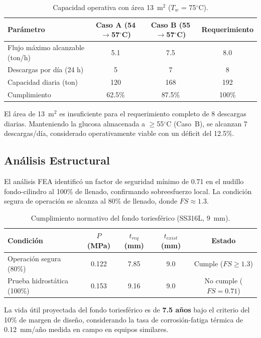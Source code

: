 \documentclass[11pt,a4paper]{article}
\begin{document}
\begin{table}[H]
\centering
\footnotesize
\caption{Capacidad operativa con área 13~m$^2$ ($T_w$ = 75$^\circ$C).}
\label{tab:capacidad}
\begin{tabular}{@{}lccc@{}}
\toprule
\textbf{Parámetro} & \textbf{Caso A (54$\rightarrow$57$^\circ$C)} & \textbf{Caso B (55$\rightarrow$57$^\circ$C)} & \textbf{Requerimiento} \\
\midrule
Flujo máximo alcanzable (ton/h) & 5.1 & 7.5 & 8.0 \\
Descargas por día (24 h) & 5 & 7 & 8 \\
Capacidad diaria (ton) & 120 & 168 & 192 \\
Cumplimiento & 62.5\% & 87.5\% & 100\% \\
\bottomrule
\end{tabular}
\end{table}

El área de 13~m$^2$ es insuficiente para el requerimiento completo de 8 descargas diarias. Manteniendo la glucosa almacenada a $\geq$55$^\circ$C (Caso~B), se alcanzan 7 descargas/día, considerado operativamente viable con un déficit del 12.5\%.

\subsection{Análisis Estructural}

El análisis FEA identificó un factor de seguridad mínimo de 0.71 en el nudillo fondo-cilindro al 100\% de llenado, confirmando sobreesfuerzo local. La condición segura de operación se alcanza al 80\% de llenado, donde $FS \approx 1.3$.

\begin{table}[H]
\centering
\footnotesize
\caption{Cumplimiento normativo del fondo toriesférico (SS316L, 9~mm).}
\label{tab:estructural}
\begin{tabular}{@{}lcccc@{}}
\toprule
\textbf{Condición} & \textbf{$P$ (MPa)} & \textbf{$t_{req}$ (mm)} & \textbf{$t_{exist}$ (mm)} & \textbf{Estado} \\
\midrule
Operación segura (80\%) & 0.122 & 7.85 & 9.0 & Cumple ($FS \geq 1.3$) \\
Prueba hidrostática (100\%) & 0.153 & 9.16 & 9.0 & No cumple ($FS = 0.71$) \\
\bottomrule
\end{tabular}
\end{table}

La vida útil proyectada del fondo toriesférico es de \textbf{7.5 años} bajo el criterio del 10\% de margen de diseño, considerando la tasa de corrosión-fatiga térmica de 0.12~mm/año medida en campo en equipos similares.
\end{document}

